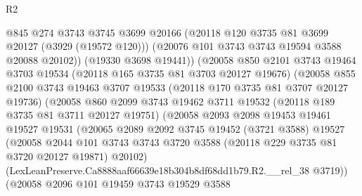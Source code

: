 \begin{lexlean}{R2}
\begin{coremodule}
                          @845
                          @274
                          @3743
                          @3745
                          @3699
                          @20166
                          (@20118 @120 @3735 @81 @3699 @20127 (@3929 (@19572 @120)))
                          (@20076 @101 @3743 @3743 @19594 @3588 @20088 @20102))
                        (@19330 @3698 @19441))
                      (@20058
                        @850
                        @2101
                        @3743
                        @19464
                        @3703
                        @19534
                        (@20118 @165 @3735 @81 @3703 @20127 @19676)
                        (@20058
                          @855
                          @2100
                          @3743
                          @19463
                          @3707
                          @19533
                          (@20118 @170 @3735 @81 @3707 @20127 @19736)
                          (@20058
                            @860
                            @2099
                            @3743
                            @19462
                            @3711
                            @19532
                            (@20118 @189 @3735 @81 @3711 @20127 @19751)
                            (@20058
                              @2093
                              @2098
                              @19453
                              @19461
                              @19527
                              @19531
                              (@20065
                                @2089
                                @2092
                                @3745
                                @19452
                                (@3721 @3588)
                                @19527
                                (@20058
                                  @2044
                                  @101
                                  @3743
                                  @3743
                                  @3720
                                  @3588
                                  (@20118 @229 @3735 @81 @3720 @20127 @19871)
                                  @20102)
                                (LexLeanPreserve.Ca8888aaf66639e18b304b8df68dd1b79.R2.__rel_38
                                  @3719))
                              (@20058
                                @2096
                                @101
                                @19459
                                @3743
                                @19529
                                @3588

\end{coremodule}
\end{lexlean}
